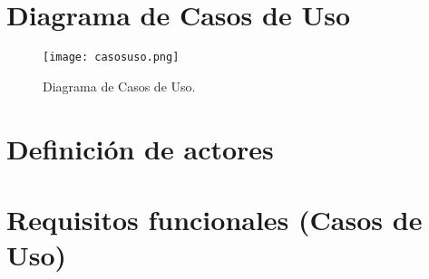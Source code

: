 \section{Diagrama de Casos de Uso}

    \begin{figure}[!ht]
      \centering
        \texttt{[image: casosuso.png]}
      \caption{Diagrama de Casos de Uso.}
      \label{casosuso}
    \end{figure}

\clearpage
\section{Definición de actores}

    \begin{table}[!ht]
        \centering
        \caption{Actor 01: agente externo.}
        \label{ACT01}
    \end{table}

    \begin{table}[!ht]
        \centering
        \caption{Actor 02: usuario del sistema.}
        \label{ACT02}
    \end{table}


\section{Requisitos funcionales (Casos de Uso)}

